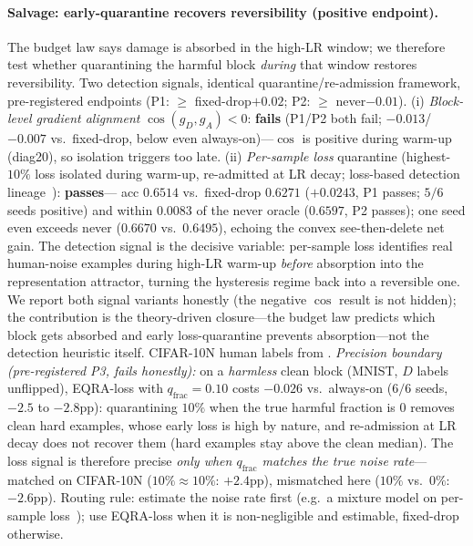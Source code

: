\documentclass{article}
\begin{document}
\paragraph{Salvage: early-quarantine recovers reversibility (positive endpoint).}
The budget law says damage is absorbed in the high-LR window; we therefore test whether
quarantining the harmful block \emph{during} that window restores reversibility. Two detection
signals, identical quarantine/re-admission framework, pre-registered endpoints
(P1: $\ge$ fixed-drop$+0.02$; P2: $\ge$ never$-0.01$). (i) \emph{Block-level gradient
alignment} $\cos(g_D,g_A)<0$: \textbf{fails} (P1/P2 both fail; $-0.013$/$-0.007$ vs.\ fixed-drop,
below even always-on)---$\cos$ is positive during warm-up (diag20), so isolation triggers too
late. (ii) \emph{Per-sample loss} quarantine (highest-$10\%$ loss isolated during warm-up,
re-admitted at LR decay; loss-based detection
lineage~\citep{arazo2019unsupervised,jiang2018mentornet,han2018coteaching}): \textbf{passes}---
acc $0.6514$ vs.\ fixed-drop $0.6271$ ($+0.0243$, P1 passes; $5/6$ seeds positive) and within
$0.0083$ of the never oracle ($0.6597$, P2 passes); one seed even exceeds never ($0.6670$ vs.\
$0.6495$), echoing the convex see-then-delete net gain. The detection signal is the decisive
variable: per-sample loss identifies real human-noise examples during high-LR warm-up
\emph{before} absorption into the representation attractor, turning the hysteresis regime back
into a reversible one. We report both signal variants honestly (the negative $\cos$ result is
not hidden); the contribution is the theory-driven closure---the budget law predicts which
block gets absorbed and early loss-quarantine prevents absorption---not the detection heuristic
itself. CIFAR-10N human labels from \citet{wei2022cifar10n}.
\emph{Precision boundary (pre-registered P3, fails honestly):} on a \emph{harmless} clean block
(MNIST, $D$ labels unflipped), EQRA-loss with $q_{\text{frac}}{=}0.10$ costs $-0.026$ vs.\
always-on ($6/6$ seeds, $-2.5$ to $-2.8$pp): quarantining $10\%$ when the true harmful fraction
is $0$ removes clean hard examples, whose early loss is high by nature, and re-admission at LR
decay does not recover them (hard examples stay above the clean median). The loss signal is
therefore precise \emph{only when $q_{\text{frac}}$ matches the true noise rate}---matched on
CIFAR-10N ($10\%{\approx}10\%$: $+2.4$pp), mismatched here ($10\%$ vs.\ $0\%$: $-2.6$pp).
Routing rule: estimate the noise rate first (e.g.\ a mixture model on per-sample
loss~\citep{arazo2019unsupervised}); use EQRA-loss when it is non-negligible and estimable,
fixed-drop otherwise.
\end{document}
